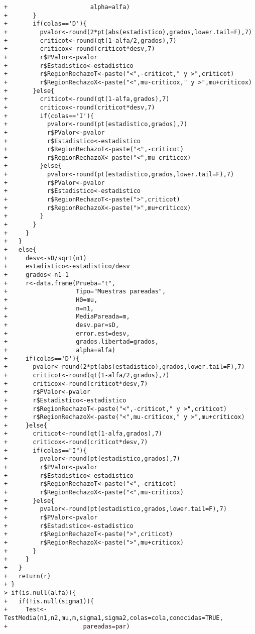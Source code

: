 \begin{solucion}
\begin{verbatim}
+                       alpha=alfa)
+       }
+       if(colas=='D'){
+         pvalor<-round(2*pt(abs(estadistico),grados,lower.tail=F),7)
+         criticot<-round(qt(1-alfa/2,grados),7)
+         criticox<-round(criticot*desv,7)
+         r$PValor<-pvalor
+         r$Estadistico<-estadistico
+         r$RegionRechazoT<-paste("<",-criticot," y >",criticot)
+         r$RegionRechazoX<-paste("<",mu-criticox," y >",mu+criticox)
+       }else{
+         criticot<-round(qt(1-alfa,grados),7)
+         criticox<-round(criticot*desv,7)
+         if(colas=='I'){
+           pvalor<-round(pt(estadistico,grados),7)
+           r$PValor<-pvalor
+           r$Estadistico<-estadistico
+           r$RegionRechazoT<-paste("<",-criticot)
+           r$RegionRechazoX<-paste("<",mu-criticox)
+         }else{
+           pvalor<-round(pt(estadistico,grados,lower.tail=F),7)
+           r$PValor<-pvalor
+           r$Estadistico<-estadistico
+           r$RegionRechazoT<-paste(">",criticot)
+           r$RegionRechazoX<-paste(">",mu+criticox)
+         }
+       }
+     }
+   }
+   else{
+     desv<-sD/sqrt(n1)
+     estadistico<-estadistico/desv
+     grados<-n1-1
+     r<-data.frame(Prueba="t",
+                   Tipo="Muestras pareadas",
+                   H0=mu,
+                   n=n1,
+                   MediaPareada=m,
+                   desv.par=sD,
+                   error.est=desv,
+                   grados.libertad=grados,
+                   alpha=alfa)
+     if(colas=='D'){
+       pvalor<-round(2*pt(abs(estadistico),grados,lower.tail=F),7)
+       criticot<-round(qt(1-alfa/2,grados),7)
+       criticox<-round(criticot*desv,7)
+       r$PValor<-pvalor
+       r$Estadistico<-estadistico
+       r$RegionRechazoT<-paste("<",-criticot," y >",criticot)
+       r$RegionRechazoX<-paste("<",mu-criticox," y >",mu+criticox)
+     }else{
+       criticot<-round(qt(1-alfa,grados),7)
+       criticox<-round(criticot*desv,7)
+       if(colas=="I"){
+         pvalor<-round(pt(estadistico,grados),7)
+         r$PValor<-pvalor
+         r$Estadistico<-estadistico
+         r$RegionRechazoT<-paste("<",-criticot)
+         r$RegionRechazoX<-paste("<",mu-criticox)
+       }else{
+         pvalor<-round(pt(estadistico,grados,lower.tail=F),7)
+         r$PValor<-pvalor
+         r$Estadistico<-estadistico
+         r$RegionRechazoT<-paste(">",criticot)
+         r$RegionRechazoX<-paste(">",mu+criticox)
+       }
+     }
+   }
+   return(r)
+ }
> if(is.null(alfa)){
+   if(!is.null(sigma1)){
+     Test<-TestMedia(n1,n2,mu,m,sigma1,sigma2,colas=cola,conocidas=TRUE,
+                     pareadas=par)

\end{verbatim}
\end{solucion}
